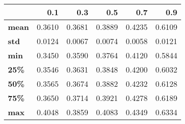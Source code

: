 \begin{tabular}{lrrrrr}
\toprule
{} &     0.1 &     0.3 &     0.5 &     0.7 &     0.9 \\
\midrule
\textbf{mean} &  0.3610 &  0.3681 &  0.3889 &  0.4235 &  0.6109 \\
\textbf{std } &  0.0124 &  0.0067 &  0.0074 &  0.0058 &  0.0121 \\
\textbf{min } &  0.3450 &  0.3590 &  0.3764 &  0.4120 &  0.5844 \\
\textbf{25\% } &  0.3546 &  0.3631 &  0.3848 &  0.4200 &  0.6032 \\
\textbf{50\% } &  0.3565 &  0.3674 &  0.3882 &  0.4232 &  0.6128 \\
\textbf{75\% } &  0.3650 &  0.3714 &  0.3921 &  0.4278 &  0.6189 \\
\textbf{max } &  0.4048 &  0.3859 &  0.4083 &  0.4349 &  0.6334 \\
\bottomrule
\end{tabular}
